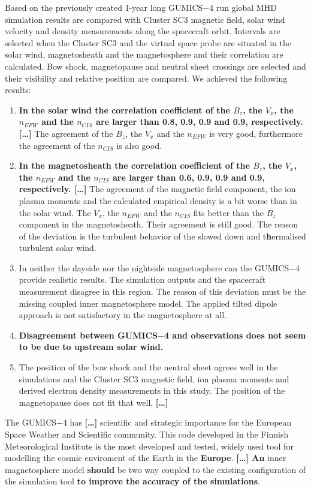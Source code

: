 \documentclass[linenumbers,draft]{agujournal}
\begin{document}
Based on the previously created 1-year long GUMICS$-$4 run global MHD simulation results are compared with Cluster SC3 magnetic field, solar wind velocity and density measurements along the spacecraft orbit. Intervals are selected when the Cluster SC3 and the virtual space probe are situated in the solar wind, magnetosheath and the magnetosphere and their correlation are calculated. Bow shock, magnetopause and neutral sheet crossings are selected and their visibility and relative position are compared. We achieved the following results:
\begin{enumerate}
\item \textbf{In the solar wind the correlation coefficient of the $B_{z}$, the $V_{x}$, the $n_{EFW}$ and the $n_{CIS}$ are larger than 0.8, 0.9, 0.9 and 0.9, respectively. \textbf{[\dots]}} The agreement of the $B_{z}$, the $V_{x}$ and the $n_{EFW}$ is very good, furthermore the agreement of the $n_{CIS}$ is also good. 
\item \textbf{In the magnetosheath the correlation coefficient of the $B_{z}$, the $V_{x}$, the $n_{EFW}$ and the $n_{CIS}$ are larger than 0.6, 0.9, 0.9 and 0.9, respectively. \textbf{[\dots]}} The agreement of the magnetic field component, the ion plasma moments and the calculated empirical density is a bit worse than in the solar wind. The $V_{x}$, the $n_{EFW}$ and the $n_{CIS}$ fits better than the $B_{z}$ component in the magnetosheath. Their agreement is still good. The reason of the deviation is the turbulent behavior of the slowed down and t\textbf{h}ermalised turbulent solar wind.
\item In neither the dayside nor the nightside magnetosphere can the GUMICS$-$4 provide realistic results. The simulation outputs and the spacecraft measurement disagree in this region. The reason of this deviation must be the missing coupled inner magnetosphere model. The applied tilted dipole approach is not satisfactory in the magnetosphere at all. 
\item \textbf{Disagreement between GUMICS$-$4 and observations does not seem to be due to upstream solar wind.}
\item The position of the bow shock and the neutral sheet agrees well in the simulations and the Cluster SC3 magnetic field, ion plasma moments and derived electron density measurements in this study. The position of the magnetopause does not fit that well. \textbf{[\dots]}
\end{enumerate}
The GUMICS$-$4 has \textbf{[\dots]} scientific and strategic importance for the European Space Weather and Scientific community. This code developed in the Finnish Meteorological Institute is the most developed and tested, widely used tool for modelling the cosmic enviroment of the Earth in the \textbf{Europe}. \textbf{[\dots] An} inner magnetosphere model \textbf{should} be two way coupled to the existing configuration of the simulation tool \textbf{to improve the accuracy of the simulations}.
\end{document}
